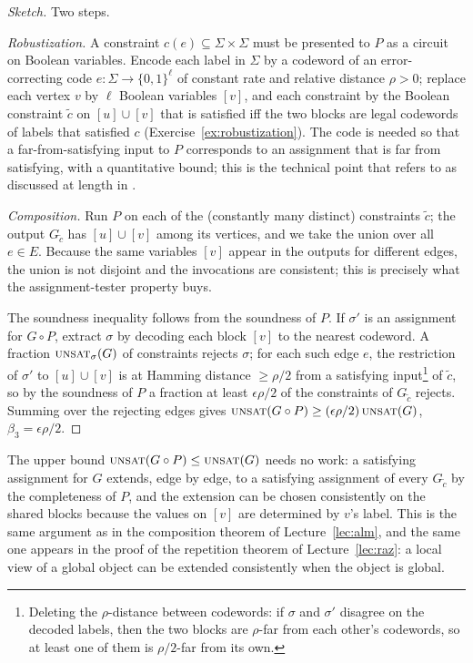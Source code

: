 \begin{proof}[Sketch]
Two steps.

\emph{Robustization.}  A constraint $c(e)\subseteq\Sigma\times\Sigma$ must be presented to $P$ as a circuit on Boolean variables.  Encode each label in $\Sigma$ by a codeword of an error-correcting code $e\colon\Sigma\to\{0,1\}^\ell$ of constant rate and relative distance $\rho>0$; replace each vertex $v$ by $\ell$ Boolean variables $[v]$, and each constraint by the Boolean constraint $\tilde c$ on $[u]\cup[v]$ that is satisfied iff the two blocks are legal codewords of labels that satisfied $c$ (Exercise~\ref{ex:robustization}).
The code is needed so that a far-from-satisfying input to $P$ corresponds to an assignment that is far from satisfying, with a quantitative bound; this is the technical point that \citet{Dinur07} refers to as discussed at length in \citet{DinurReingold04}.

\emph{Composition.}  Run $P$ on each of the (constantly many distinct) constraints $\tilde c$; the output $G_{\tilde c}$ has $[u]\cup[v]$ among its vertices, and we take the union over all $e\in E$.  Because the same variables $[v]$ appear in the outputs for different edges, the union is not disjoint and the invocations are consistent; this is precisely what the assignment-tester property buys.

The soundness inequality follows from the soundness of $P$.  If $\sigma'$ is an assignment for $G\circ P$, extract $\sigma$ by decoding each block $[v]$ to the nearest codeword.  A fraction $\textsc{unsat}_\sigma(G)$ of constraints rejects $\sigma$; for each such edge $e$, the restriction of $\sigma'$ to $[u]\cup[v]$ is at Hamming distance $\ge\rho/2$ from a satisfying input\footnote{Deleting the $\rho$-distance between codewords: if $\sigma$ and $\sigma'$ disagree on the decoded labels, then the two blocks are $\rho$-far from each other's codewords, so at least one of them is $\rho/2$-far from its own.} of $\tilde c$, so by the soundness of $P$ a fraction at least $\epsilon\rho/2$ of the constraints of $G_{\tilde c}$ rejects.
Summing over the rejecting edges gives $\textsc{unsat}(G\circ P)\ge(\epsilon\rho/2)\,\textsc{unsat}(G)$, \ie $\beta_3=\epsilon\rho/2$.
\end{proof}

\noindent
The upper bound $\textsc{unsat}(G\circ P)\le\textsc{unsat}(G)$ needs no work: a satisfying assignment for $G$ extends, edge by edge, to a satisfying assignment of every $G_{\tilde c}$ by the completeness of $P$, and the extension can be chosen consistently on the shared blocks because the values on $[v]$ are determined by $v$'s label.
This is the same argument as in the composition theorem of Lecture~\ref{lec:alm}, and the same one appears in the proof of the repetition theorem of Lecture~\ref{lec:raz}: a local view of a global object can be extended consistently when the object is global.


